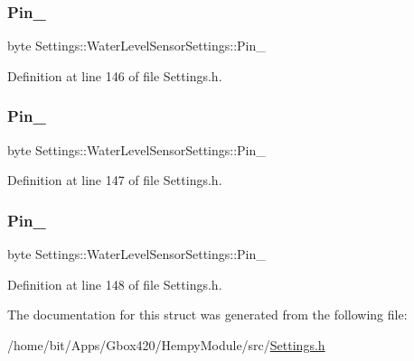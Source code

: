 \subsubsection{\texorpdfstring{Pin\+\_}{Pin\_2}}
{\footnotesize\ttfamily byte Settings\+::\+Water\+Level\+Sensor\+Settings\+::\+Pin\+\_}



Definition at line 146 of file Settings.\+h.

\mbox{\label{struct_settings_1_1_water_level_sensor_settings_a8db93bf79e5d157ac49a20305b6e5d1b}} 
\subsubsection{\texorpdfstring{Pin\+\_}{Pin\_3}}
{\footnotesize\ttfamily byte Settings\+::\+Water\+Level\+Sensor\+Settings\+::\+Pin\+\_}



Definition at line 147 of file Settings.\+h.

\mbox{\label{struct_settings_1_1_water_level_sensor_settings_a13f621821f6b2dedff7ec59cc7efddfe}} 
\subsubsection{\texorpdfstring{Pin\+\_}{Pin\_4}}
{\footnotesize\ttfamily byte Settings\+::\+Water\+Level\+Sensor\+Settings\+::\+Pin\+\_}



Definition at line 148 of file Settings.\+h.



The documentation for this struct was generated from the following file\+:\begin{DoxyCompactItemize}
\item 
/home/bit/\+Apps/\+Gbox420/\+Hempy\+Module/src/\hyperlink{_hempy_module_2src_2_settings_8h}{Settings.\+h}\end{DoxyCompactItemize}
